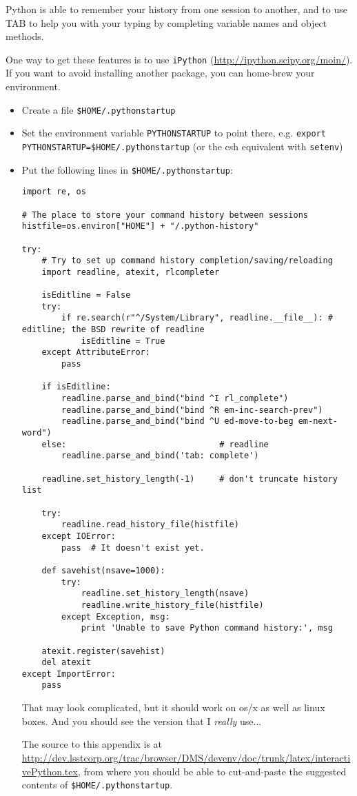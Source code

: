 
Python is able to remember your history from one session to another, and to use TAB to help you with your
typing by completing variable names and object methods.

One way to get these features is to use \verb|iPython| (\url{http://ipython.scipy.org/moin/}).  If you want to avoid installing another package, you can home-brew your environment.

\begin{itemize}
  \item Create a file \verb|$HOME/.pythonstartup|
  \item Set the environment variable \verb|PYTHONSTARTUP| to point there, e.g. \verb|export PYTHONSTARTUP=$HOME/.pythonstartup| (or the csh equivalent with \verb|setenv|)
  \item Put the following lines in \verb|$HOME/.pythonstartup|:
\begin{verbatim}
import re, os

# The place to store your command history between sessions
histfile=os.environ["HOME"] + "/.python-history"
            
try:
    # Try to set up command history completion/saving/reloading
    import readline, atexit, rlcompleter

    isEditline = False
    try:
        if re.search(r"^/System/Library", readline.__file__): # editline; the BSD rewrite of readline
            isEditline = True
    except AttributeError:
        pass

    if isEditline:
        readline.parse_and_bind("bind ^I rl_complete")
        readline.parse_and_bind("bind ^R em-inc-search-prev")
        readline.parse_and_bind("bind ^U ed-move-to-beg em-next-word")
    else:                               # readline
        readline.parse_and_bind('tab: complete')

    readline.set_history_length(-1)     # don't truncate history list

    try:
        readline.read_history_file(histfile)
    except IOError:
        pass  # It doesn't exist yet.

    def savehist(nsave=1000):
        try:
            readline.set_history_length(nsave)
            readline.write_history_file(histfile)
        except Exception, msg:
            print 'Unable to save Python command history:', msg

    atexit.register(savehist)
    del atexit
except ImportError:
    pass
\end{verbatim}

That may look complicated, but it should work on os/x as well as linux boxes.  And you should see the version that I \textit{really} use...

The source to this appendix is at \url{http://dev.lsstcorp.org/trac/browser/DMS/devenv/doc/trunk/latex/interactivePython.tex}, from where you should be able to cut-and-paste the suggested contents of \verb|$HOME/.pythonstartup|.

\end{itemize}
